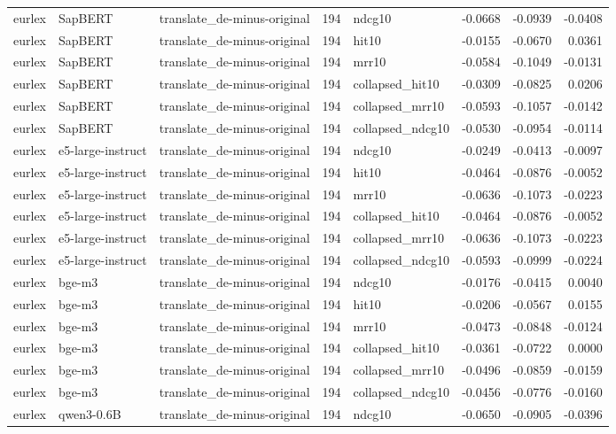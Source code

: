 \begin{tabular}{lllrlrrr}
eurlex & SapBERT & translate\_de-minus-original & 194 & ndcg10 & -0.0668 & -0.0939 & -0.0408 \\
eurlex & SapBERT & translate\_de-minus-original & 194 & hit10 & -0.0155 & -0.0670 & 0.0361 \\
eurlex & SapBERT & translate\_de-minus-original & 194 & mrr10 & -0.0584 & -0.1049 & -0.0131 \\
eurlex & SapBERT & translate\_de-minus-original & 194 & collapsed\_hit10 & -0.0309 & -0.0825 & 0.0206 \\
eurlex & SapBERT & translate\_de-minus-original & 194 & collapsed\_mrr10 & -0.0593 & -0.1057 & -0.0142 \\
eurlex & SapBERT & translate\_de-minus-original & 194 & collapsed\_ndcg10 & -0.0530 & -0.0954 & -0.0114 \\
eurlex & e5-large-instruct & translate\_de-minus-original & 194 & ndcg10 & -0.0249 & -0.0413 & -0.0097 \\
eurlex & e5-large-instruct & translate\_de-minus-original & 194 & hit10 & -0.0464 & -0.0876 & -0.0052 \\
eurlex & e5-large-instruct & translate\_de-minus-original & 194 & mrr10 & -0.0636 & -0.1073 & -0.0223 \\
eurlex & e5-large-instruct & translate\_de-minus-original & 194 & collapsed\_hit10 & -0.0464 & -0.0876 & -0.0052 \\
eurlex & e5-large-instruct & translate\_de-minus-original & 194 & collapsed\_mrr10 & -0.0636 & -0.1073 & -0.0223 \\
eurlex & e5-large-instruct & translate\_de-minus-original & 194 & collapsed\_ndcg10 & -0.0593 & -0.0999 & -0.0224 \\
eurlex & bge-m3 & translate\_de-minus-original & 194 & ndcg10 & -0.0176 & -0.0415 & 0.0040 \\
eurlex & bge-m3 & translate\_de-minus-original & 194 & hit10 & -0.0206 & -0.0567 & 0.0155 \\
eurlex & bge-m3 & translate\_de-minus-original & 194 & mrr10 & -0.0473 & -0.0848 & -0.0124 \\
eurlex & bge-m3 & translate\_de-minus-original & 194 & collapsed\_hit10 & -0.0361 & -0.0722 & 0.0000 \\
eurlex & bge-m3 & translate\_de-minus-original & 194 & collapsed\_mrr10 & -0.0496 & -0.0859 & -0.0159 \\
eurlex & bge-m3 & translate\_de-minus-original & 194 & collapsed\_ndcg10 & -0.0456 & -0.0776 & -0.0160 \\
eurlex & qwen3-0.6B & translate\_de-minus-original & 194 & ndcg10 & -0.0650 & -0.0905 & -0.0396 \\

\end{tabular}
